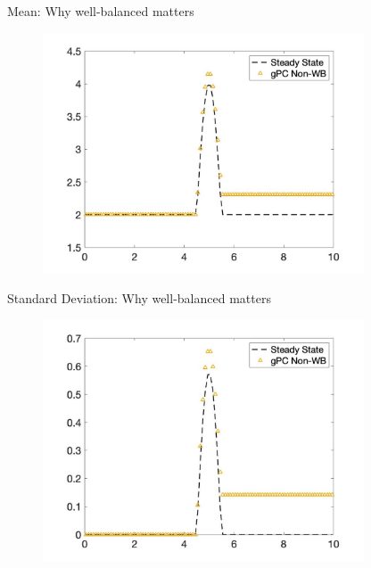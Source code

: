 \documentclass[
    pdf,
    11pt,
    xcolor={svgnames},
  ]{beamer}
\begin{document}
\begin{frame}{Mean: Why well-balanced matters}
    \begin{figure}
    \centering
    \includegraphics[width=0.85\textwidth]{./Figures/burgers_non_mean}
    \end{figure}
\end{frame}
\begin{frame}{Standard Deviation: Why well-balanced matters}
    \begin{figure}
    \centering
    \includegraphics[width=0.85\textwidth]{./Figures/burgers_non_sd}
    \end{figure}
\end{frame}
\end{document}
